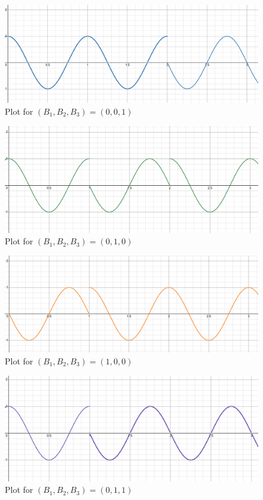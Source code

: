 \begin{enumerate}
        \begin{figure}[H]
          \centering
          \includegraphics[width=.75\textwidth]{Figures/HW10-1b}
          \caption{Plot for $(B_1,B_2,B_3)=(0,0,1)$}
          \label{fig:2}
        \end{figure}

        \begin{figure}[H]
          \centering
          \includegraphics[width=.75\textwidth]{Figures/HW10-1c}
          \caption{Plot for $(B_1,B_2,B_3)=(0,1,0)$}
          \label{fig:3}
        \end{figure}

        \begin{figure}[H]
          \centering
          \includegraphics[width=.75\textwidth]{Figures/HW10-1d}
          \caption{Plot for $(B_1,B_2,B_3)=(1,0,0)$}
          \label{fig:4}
        \end{figure}

        \begin{figure}[H]
          \centering
          \includegraphics[width=.75\textwidth]{Figures/HW10-1e}
          \caption{Plot for $(B_1,B_2,B_3)=(0,1,1)$}
          \label{fig:5}
        \end{figure}


\end{enumerate}
